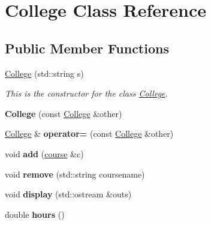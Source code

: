 \hypertarget{classCollege}{}\section{College Class Reference}
\label{classCollege}
\subsection*{Public Member Functions}
\begin{DoxyCompactItemize}
\item 
\hyperlink{classCollege_adabaf4087355e83f9f7d39f1e1498b41}{College} (std\+::string s)\hypertarget{classCollege_adabaf4087355e83f9f7d39f1e1498b41}{}\label{classCollege_adabaf4087355e83f9f7d39f1e1498b41}

\begin{DoxyCompactList}\small\item\em This is the constructor for the class \hyperlink{classCollege}{College}. \end{DoxyCompactList}\item 
{\bfseries College} (const \hyperlink{classCollege}{College} \&other)\hypertarget{classCollege_ad007ad488e5a7ef986114080d0c8e101}{}\label{classCollege_ad007ad488e5a7ef986114080d0c8e101}

\item 
\hyperlink{classCollege}{College} \& {\bfseries operator=} (const \hyperlink{classCollege}{College} \&other)\hypertarget{classCollege_af2194c9b37f80d13dc3fdba6784b18e8}{}\label{classCollege_af2194c9b37f80d13dc3fdba6784b18e8}

\item 
void {\bfseries add} (\hyperlink{classcourse}{course} \&c)\hypertarget{classCollege_a67fd1d8970b46b24ce2e0dd72598a22f}{}\label{classCollege_a67fd1d8970b46b24ce2e0dd72598a22f}

\item 
void {\bfseries remove} (std\+::string coursename)\hypertarget{classCollege_a4d2ae513b36e6421fb1ca2c08459cfe6}{}\label{classCollege_a4d2ae513b36e6421fb1ca2c08459cfe6}

\item 
void {\bfseries display} (std\+::ostream \&outs)\hypertarget{classCollege_a52ca0a164483cf5c05591cd0fb8b300c}{}\label{classCollege_a52ca0a164483cf5c05591cd0fb8b300c}

\item 
double {\bfseries hours} ()\hypertarget{classCollege_a8a7a762611a1d7e00c453390d49355fd}{}\label{classCollege_a8a7a762611a1d7e00c453390d49355fd}


\end{DoxyCompactItemize}
